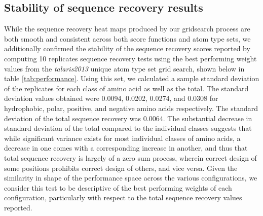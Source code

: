 \subsection{Stability of sequence recovery results}
While the sequence recovery heat maps produced by our gridsearch process are both smooth and consistent across both score functions and atom type sets, we additionally confirmed the stability of the sequence recovery scores reported by computing 10 replicates sequence recovery tests using the best performing weight values from the \textit{talaris2013} unique atom type set grid search, shown below in table \ref{tab:performance}.
Using this set, we calculated a sample standard deviation of the replicates for each class of amino acid as well as the total. 
The standard deviation values obtained were 0.0094, 0.0202, 0.0274, and 0.0308 for hydrophobic, polar, positive, and negative amino acids respectively.
The standard deviation of the total sequence recovery was 0.0064.
The substantial decrease in standard deviation of the total compared to the individual classes suggests that while significant variance exists for most individual classes of amino acids, a decrease in one comes with a corresponding increase in another, and thus that total sequence recovery is largely of a zero sum process, wherein correct design of some positions prohibits correct design of others, and vice versa.
Given the similarity in shape of the performance space across the various configurations, we consider this test to be descriptive of the best performing weights of each configuration, particularly with respect to the total sequence recovery values reported.

